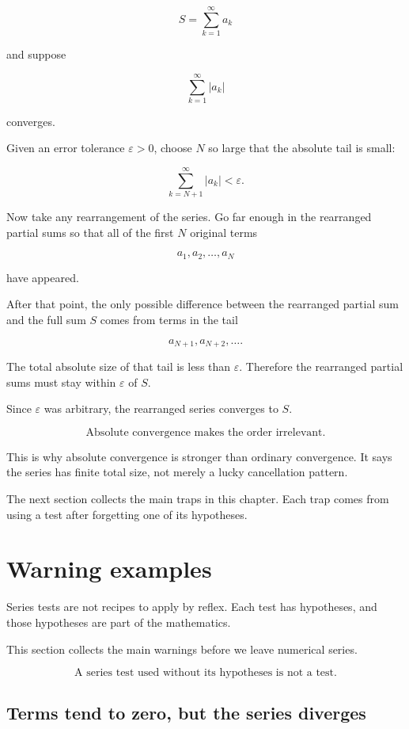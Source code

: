 \[
S=\sum_{k=1}^{\infty}a_k
\]

and suppose

\[
\sum_{k=1}^{\infty}|a_k|
\]

converges.

Given an error tolerance \(\varepsilon>0\), choose \(N\) so large that the absolute tail is
small:

\[
\sum_{k=N+1}^{\infty}|a_k|<\varepsilon.
\]

Now take any rearrangement of the series.  Go far enough in the rearranged partial sums
so that all of the first \(N\) original terms

\[
a_1,a_2,\ldots,a_N
\]

have appeared.

After that point, the only possible difference between the rearranged partial sum and
the full sum \(S\) comes from terms in the tail

\[
a_{N+1},a_{N+2},\ldots.
\]

The total absolute size of that tail is less than \(\varepsilon\).  Therefore the rearranged
partial sums must stay within \(\varepsilon\) of \(S\).

Since \(\varepsilon\) was arbitrary, the rearranged series converges to \(S\).

\[
\boxed{
\text{Absolute convergence makes the order irrelevant.}
}
\]

This is why absolute convergence is stronger than ordinary convergence.  It says the
series has finite total size, not merely a lucky cancellation pattern.

The next section collects the main traps in this chapter.  Each trap comes from using a
test after forgetting one of its hypotheses.

\section{Warning examples}
\label{sec:series-warning-examples}

Series tests are not recipes to apply by reflex.  Each test has hypotheses, and those
hypotheses are part of the mathematics.

This section collects the main warnings before we leave numerical series.

\[
\boxed{
\text{A series test used without its hypotheses is not a test.}
}
\]

\subsection{Terms tend to zero, but the series diverges}
\label{subsec:warning-terms-zero-series-diverges}


